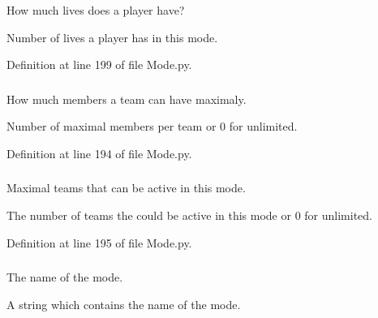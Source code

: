 How much lives does a player have? 

Number of lives a player has in this mode. 

Definition at line 199 of file Mode.py.

\hypertarget{class_mode_1_1_mode_ad4ba6cae17b92d4c8c85c35dc9418c8b}{
\subsubsection[{max\_\-team\_\-members}]{}}
\label{class_mode_1_1_mode_ad4ba6cae17b92d4c8c85c35dc9418c8b}


How much members a team can have maximaly. 

Number of maximal members per team or 0 for unlimited. 

Definition at line 194 of file Mode.py.

\hypertarget{class_mode_1_1_mode_a55c4e205a8cb20550c0f3924471522ab}{
\subsubsection[{max\_\-teams}]{}}
\label{class_mode_1_1_mode_a55c4e205a8cb20550c0f3924471522ab}


Maximal teams that can be active in this mode. 

The number of teams the could be active in this mode or 0 for unlimited. 

Definition at line 195 of file Mode.py.

\hypertarget{class_mode_1_1_mode_a38afa93ee0f4ad9e8258a510ccdbaa9c}{
\subsubsection[{name}]{}}
\label{class_mode_1_1_mode_a38afa93ee0f4ad9e8258a510ccdbaa9c}


The name of the mode. 

A string which contains the name of the mode. 

